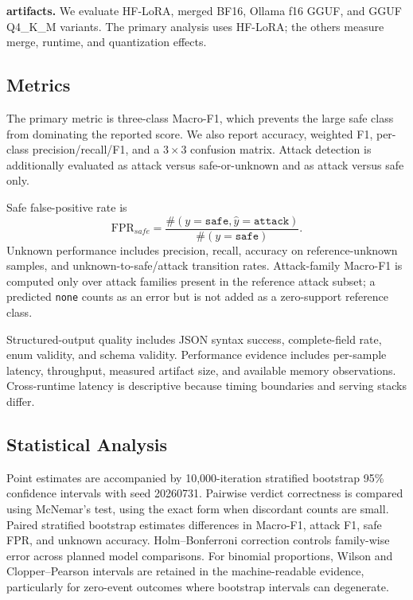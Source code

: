 \textbf{\model{} artifacts.} We evaluate HF-LoRA, merged BF16, Ollama f16 GGUF, and GGUF Q4\_K\_M variants. The primary analysis uses HF-LoRA; the others measure merge, runtime, and quantization effects.

\subsection{Metrics}
The primary metric is three-class Macro-F1, which prevents the large safe class from dominating the reported score. We also report accuracy, weighted F1, per-class precision/recall/F1, and a $3\times3$ confusion matrix. Attack detection is additionally evaluated as attack versus safe-or-unknown and as attack versus safe only.

Safe false-positive rate is
\begin{equation}
 \mathrm{FPR}_{safe}=\frac{\#(y=\texttt{safe},\hat y=\texttt{attack})}{\#(y=\texttt{safe})}.
\end{equation}
Unknown performance includes precision, recall, accuracy on reference-unknown samples, and unknown-to-safe/attack transition rates. Attack-family Macro-F1 is computed only over attack families present in the reference attack subset; a predicted \texttt{none} counts as an error but is not added as a zero-support reference class.

Structured-output quality includes JSON syntax success, complete-field rate, enum validity, and schema validity. Performance evidence includes per-sample latency, throughput, measured artifact size, and available memory observations. Cross-runtime latency is descriptive because timing boundaries and serving stacks differ.

\subsection{Statistical Analysis}
Point estimates are accompanied by 10,000-iteration stratified bootstrap 95\% confidence intervals with seed 20260731. Pairwise verdict correctness is compared using McNemar's test, using the exact form when discordant counts are small. Paired stratified bootstrap estimates differences in Macro-F1, attack F1, safe FPR, and unknown accuracy. Holm--Bonferroni correction controls family-wise error across planned model comparisons. For binomial proportions, Wilson and Clopper--Pearson intervals are retained in the machine-readable evidence, particularly for zero-event outcomes where bootstrap intervals can degenerate.

